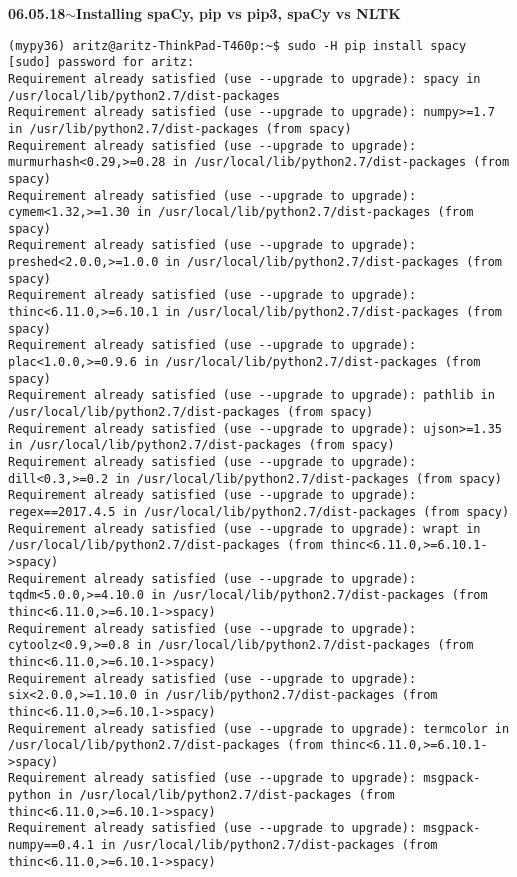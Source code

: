 \documentclass[11pt,a4paper]{article}
\newenvironment{loggentry}[2]%
{\noindent\textbf{#1}\hspace{1cm}$\mathbf{\sim}$\text{ }\textbf{#2}\\}{\vspace{0.5cm}}
\begin{document}
\begin{loggentry}{06.05.18}{Installing spaCy, pip vs pip3,  spaCy vs NLTK}
\begin{verbatim}
(mypy36) aritz@aritz-ThinkPad-T460p:~$ sudo -H pip install spacy
[sudo] password for aritz: 
Requirement already satisfied (use --upgrade to upgrade): spacy in /usr/local/lib/python2.7/dist-packages
Requirement already satisfied (use --upgrade to upgrade): numpy>=1.7 in /usr/lib/python2.7/dist-packages (from spacy)
Requirement already satisfied (use --upgrade to upgrade): murmurhash<0.29,>=0.28 in /usr/local/lib/python2.7/dist-packages (from spacy)
Requirement already satisfied (use --upgrade to upgrade): cymem<1.32,>=1.30 in /usr/local/lib/python2.7/dist-packages (from spacy)
Requirement already satisfied (use --upgrade to upgrade): preshed<2.0.0,>=1.0.0 in /usr/local/lib/python2.7/dist-packages (from spacy)
Requirement already satisfied (use --upgrade to upgrade): thinc<6.11.0,>=6.10.1 in /usr/local/lib/python2.7/dist-packages (from spacy)
Requirement already satisfied (use --upgrade to upgrade): plac<1.0.0,>=0.9.6 in /usr/local/lib/python2.7/dist-packages (from spacy)
Requirement already satisfied (use --upgrade to upgrade): pathlib in /usr/local/lib/python2.7/dist-packages (from spacy)
Requirement already satisfied (use --upgrade to upgrade): ujson>=1.35 in /usr/local/lib/python2.7/dist-packages (from spacy)
Requirement already satisfied (use --upgrade to upgrade): dill<0.3,>=0.2 in /usr/local/lib/python2.7/dist-packages (from spacy)
Requirement already satisfied (use --upgrade to upgrade): regex==2017.4.5 in /usr/local/lib/python2.7/dist-packages (from spacy)
Requirement already satisfied (use --upgrade to upgrade): wrapt in /usr/local/lib/python2.7/dist-packages (from thinc<6.11.0,>=6.10.1->spacy)
Requirement already satisfied (use --upgrade to upgrade): tqdm<5.0.0,>=4.10.0 in /usr/local/lib/python2.7/dist-packages (from thinc<6.11.0,>=6.10.1->spacy)
Requirement already satisfied (use --upgrade to upgrade): cytoolz<0.9,>=0.8 in /usr/local/lib/python2.7/dist-packages (from thinc<6.11.0,>=6.10.1->spacy)
Requirement already satisfied (use --upgrade to upgrade): six<2.0.0,>=1.10.0 in /usr/lib/python2.7/dist-packages (from thinc<6.11.0,>=6.10.1->spacy)
Requirement already satisfied (use --upgrade to upgrade): termcolor in /usr/local/lib/python2.7/dist-packages (from thinc<6.11.0,>=6.10.1->spacy)
Requirement already satisfied (use --upgrade to upgrade): msgpack-python in /usr/local/lib/python2.7/dist-packages (from thinc<6.11.0,>=6.10.1->spacy)
Requirement already satisfied (use --upgrade to upgrade): msgpack-numpy==0.4.1 in /usr/local/lib/python2.7/dist-packages (from thinc<6.11.0,>=6.10.1->spacy)

\end{verbatim}
\end{loggentry}
\end{document}
